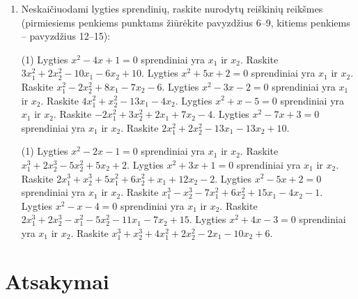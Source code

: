 \documentclass[12pt, a4paper]{article}
\begin{document}
\begin{enumerate}[label=\textbf{\arabic* užduotis.}, leftmargin=*]
    \item Neskaičiuodami lygties sprendinių, raskite nurodytų reiškinių reikšmes (pirmiesiems penkiems punktams žiūrėkite pavyzdžius 6–9, kitiems penkiems – pavyzdžius 12–15):
    \begin{tasks}[label={(\arabic*)}, label-offset=0.9em](1)
        \task Lygties $x^2-4x+1=0$ sprendiniai yra $x_1$ ir $x_2$. Raskite $3x_1^2+2x_2^2-10x_1-6x_2+10$.
        \task Lygties $x^2+5x+2=0$ sprendiniai yra $x_1$ ir $x_2$. Raskite $x_1^2-2x_2^2+8x_1-7x_2-6$.
        \task Lygties $x^2-3x-2=0$ sprendiniai yra $x_1$ ir $x_2$. Raskite $4x_1^2+x_2^2-13x_1-4x_2$.
        \task Lygties $x^2+x-5=0$ sprendiniai yra $x_1$ ir $x_2$. Raskite $-2x_1^2+3x_2^2+2x_1+7x_2-4$.
        \task Lygties $x^2-7x+3=0$ sprendiniai yra $x_1$ ir $x_2$. Raskite $2x_1^2+2x_2^2-13x_1-13x_2+10$.
    \end{tasks}
    \begin{tasks}[label={(\arabic*)}, label-offset=0.9em, resume](1)
        \task Lygties $x^2-2x-1=0$ sprendiniai yra $x_1$ ir $x_2$. Raskite $x_1^3+2x_2^3-5x_2^2+5x_2+2$.
        \task Lygties $x^2+3x+1=0$ sprendiniai yra $x_1$ ir $x_2$. Raskite $2x_1^3+x_2^3+5x_1^2+6x_2^2+x_1+12x_2-2$.
        \task Lygties $x^2-5x+2=0$ sprendiniai yra $x_1$ ir $x_2$. Raskite $x_1^3-x_2^3-7x_1^2+6x_2^2+15x_1-4x_2-1$.
        \task Lygties $x^2-x-4=0$ sprendiniai yra $x_1$ ir $x_2$. Raskite $2x_1^3+2x_2^3-x_1^2-5x_2^2-11x_1-7x_2+15$.
        \task Lygties $x^2+4x-3=0$ sprendiniai yra $x_1$ ir $x_2$. Raskite $x_1^3+x_2^3+4x_1^2+2x_2^2-2x_1-10x_2+6$.
    \end{tasks}
\end{enumerate}

\newpage
\section{Atsakymai}
\end{document}
